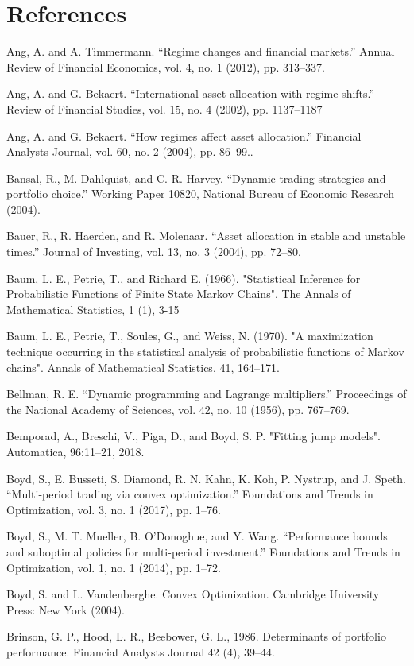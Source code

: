 \newpage
\section{References}

Ang, A. and A. Timmermann. “Regime changes and financial markets.” Annual Review of Financial Economics, vol. 4, no. 1 (2012), pp. 313–337.

Ang, A. and G. Bekaert. “International asset allocation with regime shifts.” Review of Financial Studies, vol. 15, no. 4 (2002), pp. 1137–1187

Ang, A. and G. Bekaert. “How regimes affect asset allocation.” Financial Analysts Journal, vol. 60, no. 2 (2004), pp. 86–99..

Bansal, R., M. Dahlquist, and C. R. Harvey. “Dynamic trading strategies and portfolio choice.” Working Paper 10820, National Bureau of Economic Research (2004).

Bauer, R., R. Haerden, and R. Molenaar. “Asset allocation in stable and unstable times.” Journal of Investing, vol. 13, no. 3 (2004), pp. 72–80.

Baum, L. E., Petrie, T., and Richard E. (1966). "Statistical Inference for Probabilistic Functions of Finite State Markov Chains". The Annals of Mathematical Statistics, 1 (1), 3-15

Baum, L. E., Petrie, T., Soules, G., and Weiss, N. (1970). "A maximization technique occurring in the
statistical analysis of probabilistic functions of Markov chains". Annals of Mathematical Statistics, 41, 164–171.

Bellman, R. E. “Dynamic programming and Lagrange multipliers.” Proceedings of the National Academy of Sciences, vol. 42, no. 10 (1956), pp. 767–769.

Bemporad, A., Breschi, V., Piga, D., and Boyd, S. P. "Fitting jump models". Automatica, 96:11–21, 2018.

Boyd, S., E. Busseti, S. Diamond, R. N. Kahn, K. Koh, P. Nystrup, and J. Speth. “Multi-period trading via convex optimization.” Foundations and Trends in Optimization, vol. 3, no. 1 (2017), pp. 1–76.

Boyd, S., M. T. Mueller, B. O’Donoghue, and Y. Wang. “Performance bounds and suboptimal policies for multi-period investment.” Foundations and Trends in Optimization, vol. 1, no. 1 (2014), pp. 1–72.

Boyd, S. and L. Vandenberghe. Convex Optimization. Cambridge University Press: New York (2004).

Brinson, G. P., Hood, L. R., Beebower, G. L., 1986. Determinants of portfolio performance. Financial Analysts Journal 42 (4), 39–44.


